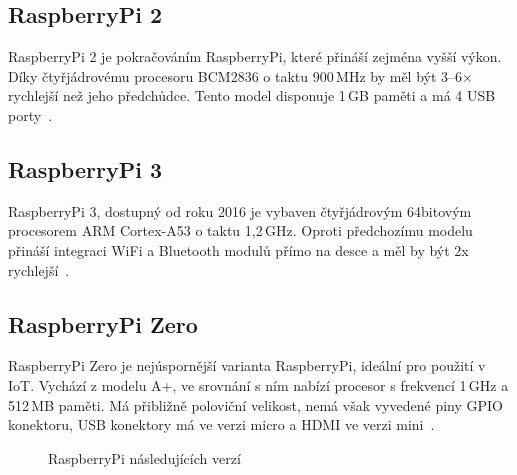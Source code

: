 	\subsection{RaspberryPi 2}
	RaspberryPi 2 je pokračováním RaspberryPi, které přináší zejména vyšší výkon. Díky čtyřjádrovému procesoru BCM2836 o taktu 900\,MHz by měl být 3–6× rychlejší než jeho předchůdce. Tento model disponuje 1\,GB paměti a má 4 USB porty~\cite{RaspiTwo}.


\subsection{RaspberryPi 3}
		RaspberryPi 3, dostupný od roku 2016 je vybaven čtyřjádrovým 64bitovým procesorem ARM Cortex-A53 o taktu 1,2\,GHz. Oproti předchozímu modelu přináší integraci WiFi a Bluetooth modulů přímo na desce a měl by být 2x rychlejší~\cite{RaspiThree}.
		
\subsection{RaspberryPi Zero}
		RaspberryPi Zero je nejúspornější varianta RaspberryPi, ideální pro použití v IoT. Vychází z modelu A+, ve srovnání s ním nabízí procesor s frekvencí 1\,GHz a 512\,MB paměti. Má přibližně poloviční velikost, nemá však vyvedené piny GPIO konektoru, USB konektory má ve verzi micro a HDMI ve verzi mini~\cite{RaspiZero}.

\begin{figure}[!ht]
    \centering
			\hspace*{5mm}
			\hspace*{5mm}
		\caption{RaspberryPi následujících verzí}
		\vspace{-20pt}	
\end{figure}


